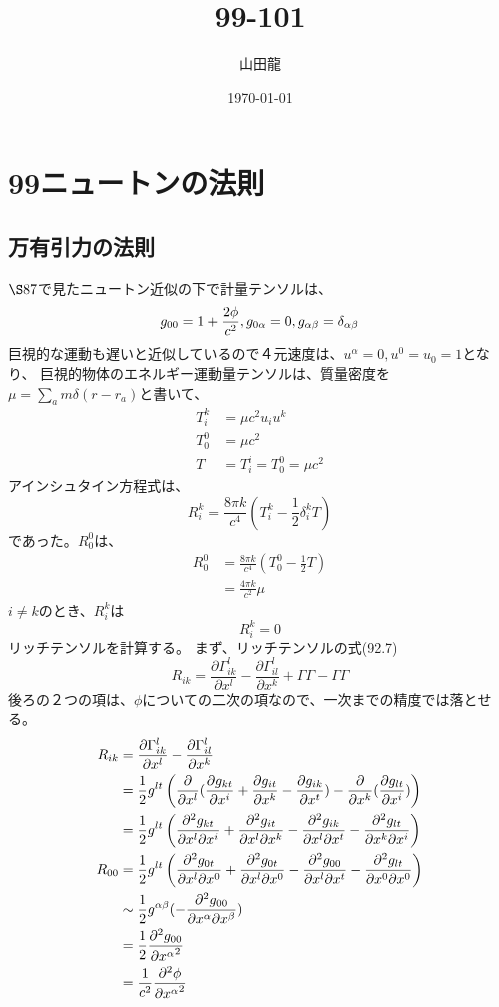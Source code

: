 \documentclass{jsarticle}
\date{\today}
\author{山田龍}
\title{99-101}
\newcommand{\pder}[2][]{\frac{\partial#1}{\partial#2}}
\newcommand{\ppder}[2][]{\frac{\partial^2#1}{{\partial#2}^2}}
\newcommand{\pikdergx}[3][]{\frac{\partial^2 g_{#1}}{{\partial x^{#2} \partial x^{#3}}}}
\newcommand{\pderx}[2][]{\pder[#1]{x^{#2}}}
\newcommand{\pdergx}[2][]{\pderx[g_{#1}]{#2}}
\newcommand{\half}{\frac{1}{2}}
\newcommand{\beq}{\begin{equation}}
\newcommand{\eeq}{\end{equation}}
\begin{document}
\maketitle
\section{99ニュートンの法則}
\subsection{万有引力の法則}
$\S 87$で見たニュートン近似の下で計量テンソルは、
\beq
g_{00} = 1 + \frac{2\phi}{c^2},g_{0\al} = 0,g_{\al \be} = \delta_{\al \be}
\eeq
巨視的な運動も遅いと近似しているので４元速度は、$u^\alpha = 0, u^0 = u_0 = 1$となり、
巨視的物体のエネルギー運動量テンソルは、質量密度を$\mu = \sum_a m \delta(r-r_a)$と書いて、
\begin{align}
    T^k_{i} &= \mu c^2 u_i u^k\\
    T^0_0 &= \mu c^2\\
    T &= T^i_i = T^0_0 = \mu c^2
\end{align}
アインシュタイン方程式は、
\beq
    R^k_i = \frac{8\pi k}{c^4} (T^k_i - \half \delta^k_i T)
\eeq
であった。$R^0_0$は、
\begin{align}
    R^0_0 &= \frac{8\pi k}{c^4} (T^0_0 - \half T)\\
        &= \frac{4\pi k}{c^2} \mu
\end{align}
$i \neq k$のとき、$R^k_i$は
\beq
    R^k_i = 0
\eeq
リッチテンソルを計算する。
まず、リッチテンソルの式(92.7)
\beq
    R_{ik} =  \pder[\Gamma^l_{ik}]{x^l} - \pder[\Gamma^l_{il}]{x^k}
+ \Gamma \Gamma - \Gamma \Gamma
\eeq
後ろの２つの項は、$\phi$についての二次の項なので、一次までの精度では落とせる。
\begin{align}
    R_{ik} &= \pder[\Gamma^l_{ik}]{x^l} - \pder[\Gamma^l_{il}]{x^k}\\
            &= \half g^{lt} 
            \left( \pderx[]{l}(\pdergx[kt]{i} + \pdergx[it]{k} - \pdergx[ik]{t}) - \pderx[]{k}(\pdergx[lt]{i})\right)\\
            &= \half g^{lt} \left(
            \pikdergx[kt]{l}{i} + \pikdergx[it]{l}{k} - \pikdergx[ik]{l}{t} - \pikdergx[lt]{k}{i}
            \right)\\
    R_{00} &= \half g^{lt} \left(
            \pikdergx[0t]{l}{0} + \pikdergx[0t]{l}{0} - \pikdergx[00]{l}{t} - \pikdergx[lt]{0}{0}
            \right)\\
           &\sim \half g^{\al \be}(- \pikdergx[00]{\al}{\be} )\\
           &= \half \ppder[g_{00}]{x^\al}\\
           &= \frac{1}{c^2} \ppder[\phi]{x^\al}
\end{align}
\end{document}
